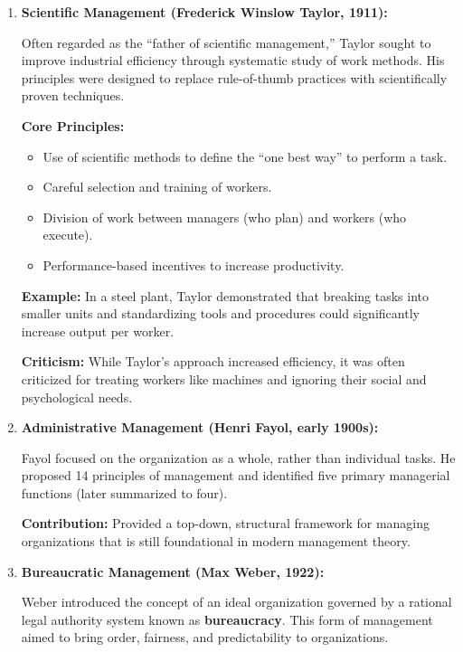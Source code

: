 \documentclass[10pt,a4paper]{book}
\begin{document}
\begin{enumerate}
    \item \textbf{Scientific Management (Frederick Winslow Taylor, 1911):}

    Often regarded as the “father of scientific management,” Taylor sought to improve industrial efficiency through systematic study of work methods. His principles were designed to replace rule-of-thumb practices with scientifically proven techniques.

    \textbf{Core Principles:}
    \begin{itemize}
        \item Use of scientific methods to define the “one best way” to perform a task.
        \item Careful selection and training of workers.
        \item Division of work between managers (who plan) and workers (who execute).
        \item Performance-based incentives to increase productivity.
    \end{itemize}

    \textbf{Example:} In a steel plant, Taylor demonstrated that breaking tasks into smaller units and standardizing tools and procedures could significantly increase output per worker.

    \textbf{Criticism:} While Taylor’s approach increased efficiency, it was often criticized for treating workers like machines and ignoring their social and psychological needs.

    \item \textbf{Administrative Management (Henri Fayol, early 1900s):}

    Fayol focused on the organization as a whole, rather than individual tasks. He proposed 14 principles of management and identified five primary managerial functions (later summarized to four).

    \textbf{Contribution:} Provided a top-down, structural framework for managing organizations that is still foundational in modern management theory.

    \item \textbf{Bureaucratic Management (Max Weber, 1922):}

    Weber introduced the concept of an ideal organization governed by a rational legal authority system known as \textbf{bureaucracy}. This form of management aimed to bring order, fairness, and predictability to organizations.


\end{enumerate}
\end{document}
